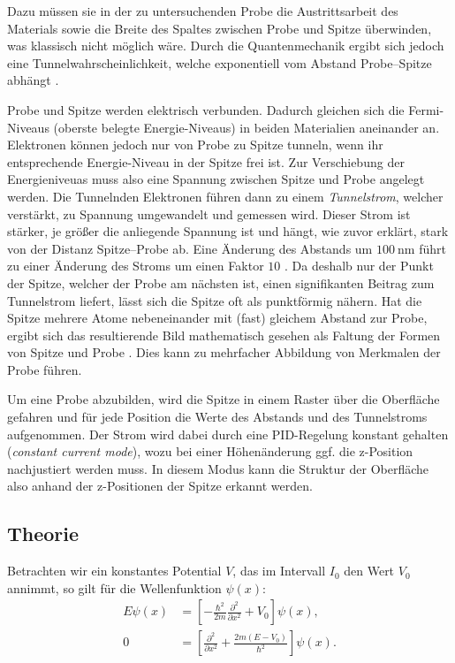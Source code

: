 \documentclass{article}
\begin{document}
Dazu müssen sie in der zu untersuchenden Probe die Austrittsarbeit des Materials 
sowie  die Breite des Spaltes zwischen Probe und Spitze überwinden,
was klassisch nicht möglich wäre. Durch die Quantenmechanik ergibt sich jedoch eine
Tunnelwahrscheinlichkeit, welche exponentiell vom Abstand Probe--Spitze abhängt \cite{stm-paper}.

Probe und Spitze werden elektrisch verbunden. Dadurch gleichen sich die Fermi-Niveaus (oberste belegte Energie-Niveaus) in beiden Materialien aneinander an.
Elektronen können jedoch nur von Probe zu Spitze tunneln, wenn ihr entsprechende Energie-Niveau
in der Spitze frei ist. Zur Verschiebung der Energieniveuas muss also eine Spannung zwischen Spitze und Probe angelegt werden.
Die Tunnelnden Elektronen führen dann zu einem \textit{Tunnelstrom}, welcher verstärkt,
zu Spannung umgewandelt und gemessen wird. Dieser Strom ist stärker, je größer die
anliegende Spannung ist und hängt,
wie zuvor erklärt, stark von der Distanz Spitze--Probe ab. Eine Änderung des Abstands
um $\SI{100}{\nm}$ führt zu einer Änderung des Stroms um einen Faktor $10$ \cite{naio-video}.
Da deshalb nur der Punkt der Spitze, welcher der Probe am nächsten ist, einen signifikanten Beitrag zum Tunnelstrom liefert,
lässt sich die Spitze oft als punktförmig nähern.
Hat die Spitze mehrere Atome nebeneinander mit (fast) gleichem Abstand zur Probe,
ergibt sich das resultierende Bild mathematisch gesehen als Faltung der Formen
von Spitze und Probe \cite{Anleitung}. Dies kann zu mehrfacher Abbildung von 
Merkmalen der Probe führen.

Um eine Probe abzubilden, wird die Spitze in einem Raster über die Oberfläche 
gefahren und für jede Position die Werte des Abstands und des Tunnelstroms aufgenommen.
Der Strom wird dabei durch eine PID-Regelung konstant gehalten (\textit{constant current mode}), wozu bei einer Höhenänderung ggf. die z-Position nachjustiert werden muss. In diesem Modus kann die Struktur der Oberfläche also anhand der z-Positionen
der Spitze erkannt werden.

\subsection*{Theorie}
Betrachten wir ein konstantes Potential \( V \), das im Intervall \( I_0 \) den Wert \( V_0 \) annimmt, so gilt für die Wellenfunktion \( \psi(x) \): 
\begin{align*}
    E \psi(x) &= \left[ - \frac{\hbar^2}{2m} \frac{\partial^2}{\partial x^2} + V_0 \right] \psi(x), \\
    0 &= \left[ \frac{\partial^2}{\partial x^2} + \frac{2m(E - V_0)}{\hbar^2} \right] \psi(x).
\end{align*}
\end{document}
